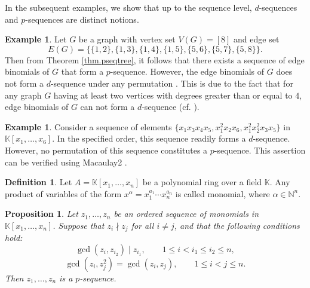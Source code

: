 \documentclass[11pt,a4paper,reqno]{amsart}
\newtheorem{proposition}[theorem]{Proposition}
\theoremstyle{definition}
\newtheorem{definition}[theorem]{Definition}
\newtheorem{example}[theorem]{Example}
\begin{document}
In the subsequent examples, we show that up to the sequence level, $d$-sequences and $p$-sequences are distinct notions. 
\begin{example}
    Let $G$ be a graph with vertex set $V(G)=[8]$ and edge set $$E(G)=\{\{1,2\},\{1,3\},\{1,4\},\{1,5\},\{5,6\},\{5,7\},\{5,8\}\}.$$ Then from Theorem \ref{thm.pseqtree}, it follows that there exists a sequence of edge binomials of $G$ that form a $p$-sequence.  However, the edge binomials of $G$ does not form a $d$-sequence under any permutation . This is due to the fact that for any graph $G$ having at least two vertices with degrees greater than or equal to $4$, edge binomials of $G$ can not form a $d$-sequence (cf. \cite[Corollary 3.2]{AN}).
\end{example} 
\begin{example}  \label{rem.pseqdseq}
    Consider a sequence of  elements $\{x_1x_3x_4x_5,x_1^2x_2x_6,x_1^2x_2^2x_3x_5\}$ in $\mathbb{K}[x_1,\ldots,x_6]$. In the specified order, this sequence readily forms a $d$-sequence. However, no permutation of this sequence constitutes a $p$-sequence. This assertion can be verified using Macaulay2 \cite{M2}.
\end{example} 



\begin{definition}
    Let $A=\mathbb{K}[x_1,\ldots,x_n]$ be a polynomial ring over a field $\mathbb{K}$. Any product of variables of the form $x^\alpha = x_1^{a_1}\cdots x_n^{a_n}$ is called monomial, where $\alpha \in \mathbb{N}^n$.
\end{definition}



\begin{proposition}\label{prop.p-mon}
Let \(z_1,\ldots,z_n\) be an ordered sequence of monomials in \(\mathbb{K}[x_1,\ldots,x_n]\). Suppose that \(z_i \nmid z_j\) for all \(i \neq j\), and that the following conditions hold:
\begin{equation}\label{cond1}
\gcd(z_i,z_{i_2}) \mid z_{i_1},
\qquad
1 \leq i < i_1 \leq i_2 \leq n,
\end{equation}
\begin{equation}\label{cond2}
\gcd(z_i,z_j^2) = \gcd(z_i,z_j),
\qquad
1 \leq i < j \leq n.
\end{equation}
Then \(z_1,\ldots,z_n\) is a \(p\)-sequence.
\end{proposition}
\end{document}
